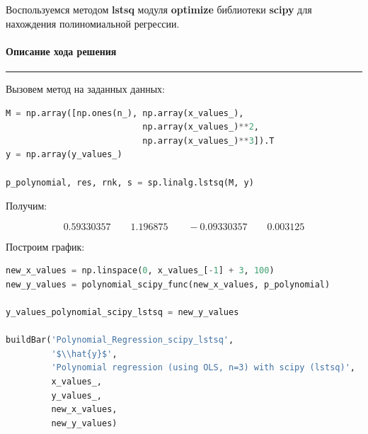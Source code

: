 \documentclass[a4paper, 14pt]{extarticle}
\begin{document}
Воспользуемся методом \textbf{lstsq} модуля \textbf{optimize} библиотеки \textbf{scipy} для 
нахождения полиномиальной регрессии.

\paragraph*{{Описание хода решения}}\vspace{-20pt}\rule{\linewidth}{0.1mm}

Вызовем метод на заданных данных:

\begin{center}
    \begin{lstlisting}[language=Python]
M = np.array([np.ones(n_), np.array(x_values_), 
                           np.array(x_values_)**2, 
                           np.array(x_values_)**3]).T
y = np.array(y_values_)

p_polynomial, res, rnk, s = sp.linalg.lstsq(M, y)
    \end{lstlisting}
\end{center}

Получим:

\begin{equation*}
    0.59330357 \qquad  1.196875   \qquad -0.09330357 \qquad  0.003125
\end{equation*}

Построим график:

\begin{center}
    \begin{lstlisting}[language=Python]
new_x_values = np.linspace(0, x_values_[-1] + 3, 100)
new_y_values = polynomial_scipy_func(new_x_values, p_polynomial)

y_values_polynomial_scipy_lstsq = new_y_values

buildBar('Polynomial_Regression_scipy_lstsq', 
         '$\\hat{y}$', 
         'Polynomial regression (using OLS, n=3) with scipy (lstsq)', 
         x_values_, 
         y_values_, 
         new_x_values, 
         new_y_values)
    \end{lstlisting}
\end{center}
\end{document}
